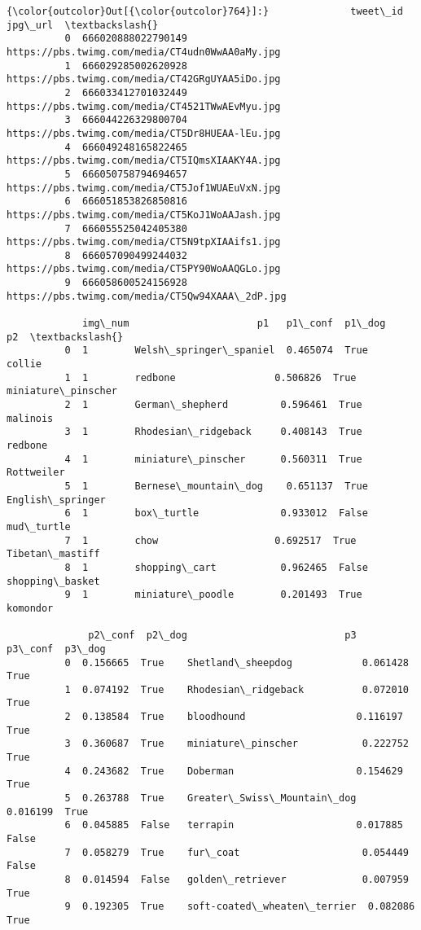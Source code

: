 \documentclass[11pt]{article}
\begin{document}
\begin{Verbatim}[commandchars=\\\{\}]
{\color{outcolor}Out[{\color{outcolor}764}]:}              tweet\_id                                          jpg\_url  \textbackslash{}
          0  666020888022790149  https://pbs.twimg.com/media/CT4udn0WwAA0aMy.jpg   
          1  666029285002620928  https://pbs.twimg.com/media/CT42GRgUYAA5iDo.jpg   
          2  666033412701032449  https://pbs.twimg.com/media/CT4521TWwAEvMyu.jpg   
          3  666044226329800704  https://pbs.twimg.com/media/CT5Dr8HUEAA-lEu.jpg   
          4  666049248165822465  https://pbs.twimg.com/media/CT5IQmsXIAAKY4A.jpg   
          5  666050758794694657  https://pbs.twimg.com/media/CT5Jof1WUAEuVxN.jpg   
          6  666051853826850816  https://pbs.twimg.com/media/CT5KoJ1WoAAJash.jpg   
          7  666055525042405380  https://pbs.twimg.com/media/CT5N9tpXIAAifs1.jpg   
          8  666057090499244032  https://pbs.twimg.com/media/CT5PY90WoAAQGLo.jpg   
          9  666058600524156928  https://pbs.twimg.com/media/CT5Qw94XAAA\_2dP.jpg   
          
             img\_num                      p1   p1\_conf  p1\_dog                  p2  \textbackslash{}
          0  1        Welsh\_springer\_spaniel  0.465074  True    collie               
          1  1        redbone                 0.506826  True    miniature\_pinscher   
          2  1        German\_shepherd         0.596461  True    malinois             
          3  1        Rhodesian\_ridgeback     0.408143  True    redbone              
          4  1        miniature\_pinscher      0.560311  True    Rottweiler           
          5  1        Bernese\_mountain\_dog    0.651137  True    English\_springer     
          6  1        box\_turtle              0.933012  False   mud\_turtle           
          7  1        chow                    0.692517  True    Tibetan\_mastiff      
          8  1        shopping\_cart           0.962465  False   shopping\_basket      
          9  1        miniature\_poodle        0.201493  True    komondor             
          
              p2\_conf  p2\_dog                           p3   p3\_conf  p3\_dog  
          0  0.156665  True    Shetland\_sheepdog            0.061428  True    
          1  0.074192  True    Rhodesian\_ridgeback          0.072010  True    
          2  0.138584  True    bloodhound                   0.116197  True    
          3  0.360687  True    miniature\_pinscher           0.222752  True    
          4  0.243682  True    Doberman                     0.154629  True    
          5  0.263788  True    Greater\_Swiss\_Mountain\_dog   0.016199  True    
          6  0.045885  False   terrapin                     0.017885  False   
          7  0.058279  True    fur\_coat                     0.054449  False   
          8  0.014594  False   golden\_retriever             0.007959  True    
          9  0.192305  True    soft-coated\_wheaten\_terrier  0.082086  True    
\end{Verbatim}
            
\end{document}
